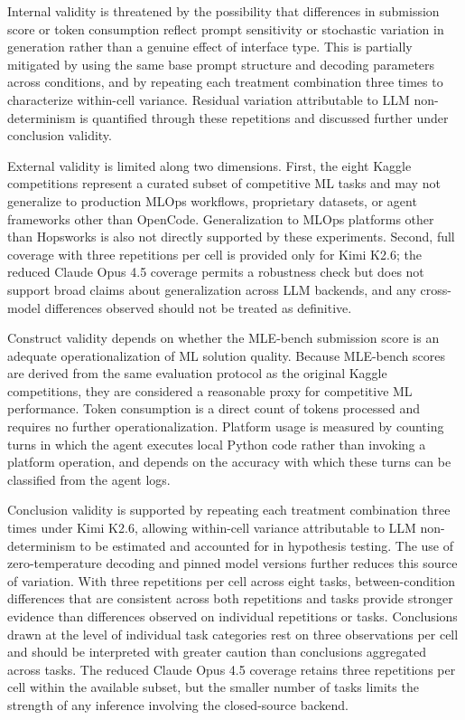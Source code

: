 \documentclass[
english,                 %
bibtex,                  %
includeExtraAbstracts, %
]{kththesis}
\numberwithin{listing}{chapter}
\begin{document}
Internal validity is threatened by the possibility that differences in submission score or token consumption reflect prompt sensitivity or stochastic variation in generation rather than a genuine effect of interface type. This is partially mitigated by using the same base prompt structure and decoding parameters across conditions, and by repeating each treatment combination three times to characterize within-cell variance. Residual variation attributable to \gls{LLM} non-determinism is quantified through these repetitions and discussed further under conclusion validity.

External validity is limited along two dimensions. First, the eight Kaggle competitions represent a curated subset of competitive \gls{ML} tasks and may not generalize to production \gls{MLOps} workflows, proprietary datasets, or agent frameworks other than OpenCode. Generalization to \gls{MLOps} platforms other than Hopsworks is also not directly supported by these experiments. Second, full coverage with three repetitions per cell is provided only for Kimi K2.6; the reduced Claude Opus 4.5 coverage permits a robustness check but does not support broad claims about generalization across \gls{LLM} backends, and any cross-model differences observed should not be treated as definitive.

Construct validity depends on whether the \gls{MLE}-bench submission score is an adequate operationalization of \gls{ML} solution quality. Because \gls{MLE}-bench scores are derived from the same evaluation protocol as the original Kaggle competitions, they are considered a reasonable proxy for competitive \gls{ML} performance. Token consumption is a direct count of tokens processed and requires no further operationalization. Platform usage is measured by counting turns in which the agent executes local Python code rather than invoking a platform operation, and depends on the accuracy with which these turns can be classified from the agent logs.

Conclusion validity is supported by repeating each treatment combination three times under Kimi K2.6, allowing within-cell variance attributable to \gls{LLM} non-determinism to be estimated and accounted for in hypothesis testing. The use of zero-temperature decoding and pinned model versions further reduces this source of variation. With three repetitions per cell across eight tasks, between-condition differences that are consistent across both repetitions and tasks provide stronger evidence than differences observed on individual repetitions or tasks. Conclusions drawn at the level of individual task categories rest on three observations per cell and should be interpreted with greater caution than conclusions aggregated across tasks. The reduced Claude Opus 4.5 coverage retains three repetitions per cell within the available subset, but the smaller number of tasks limits the strength of any inference involving the closed-source backend.
\end{document}
